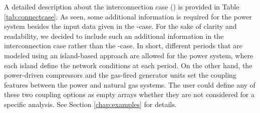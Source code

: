 \begin{appendix}
A detailed description about the interconnection case () is provided in Table \ref{tab:connectcase}. As seen, some additional information is required for the power system besides the input data given in the \matpower{}-case. For the sake of clarity and readability, we decided to include such an additional information in the interconnection case rather than the \matpower{}-case. In short, different periods that are modeled using an island-based approach are allowed for the power system, where each island define the network conditions at each period. On the other hand, the power-driven compressors and the gas-fired generator units set the coupling features between the power and natural gas systems. The user could define any of these two coupling options as empty arrays whether they are not considered for a specific analysis. See Section \ref{chap:examples} for details.



\end{appendix}
